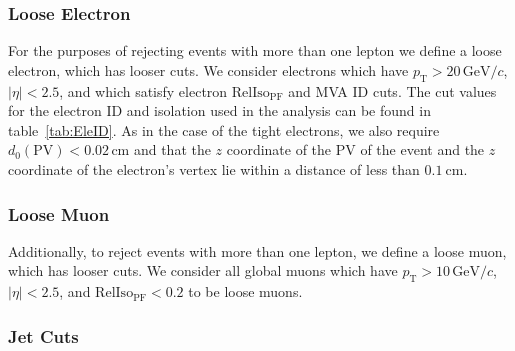 \subsubsection{Loose Electron}
For the purposes of rejecting events with more than one lepton we
define a loose electron, which has looser cuts. We consider electrons
which have $p_{\mathrm{T}} > 20\,\mathrm{GeV}/c$, $|\eta| < 2.5$,
and which satisfy electron $\mathrm{RelIso_{\mathrm{PF}}}$ and MVA ID
cuts. The cut values for the electron ID and isolation used in the
analysis can be found in table~\ref{tab:EleID}. As in the case of the
tight electrons, we also require $d_0(\mathrm{PV}) <
0.02\,\mathrm{cm}$ and that the $z$ coordinate of the PV of the event
and the $z$ coordinate of the electron's vertex lie within a distance
of less than $0.1~\mathrm{cm}$.

\subsubsection{Loose Muon}
Additionally, to reject events with more than one lepton, we define a
loose muon, which has looser cuts. We consider all global muons which
have $p_{\mathrm{T}} > 10\,\mathrm{GeV}/c$, $|\eta| < 2.5$, and
$\mathrm{RelIso_{\mathrm{PF}}} < 0.2$ to be loose muons.

\subsubsection{Jet Cuts}
\label{sec:firstStep_jets}

